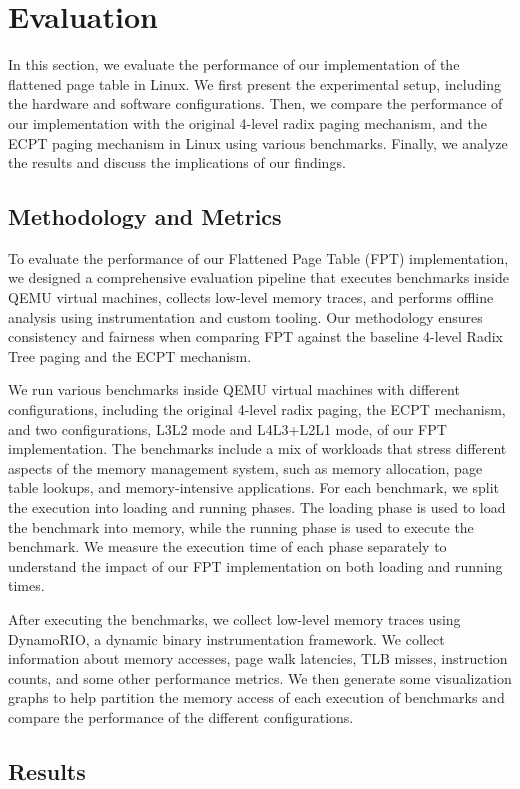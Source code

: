 \section{Evaluation}

In this section, we evaluate the performance of our implementation of the flattened page table in Linux. We first present the experimental setup, including the hardware and software configurations. Then, we compare the performance of our implementation with the original 4-level radix paging mechanism, and the ECPT paging mechanism in Linux using various benchmarks. Finally, we analyze the results and discuss the implications of our findings.


\subsection{Methodology and Metrics}

To evaluate the performance of our Flattened Page Table (FPT) implementation, we designed a comprehensive evaluation pipeline that executes benchmarks inside QEMU virtual machines, collects low-level memory traces, and performs offline analysis using instrumentation and custom tooling. Our methodology ensures consistency and fairness when comparing FPT against the baseline 4-level Radix Tree paging and the ECPT mechanism.

We run various benchmarks inside QEMU virtual machines with different configurations, including the original 4-level radix paging, the ECPT mechanism, and two configurations, L3L2 mode and L4L3+L2L1 mode, of our FPT implementation. The benchmarks include a mix of workloads that stress different aspects of the memory management system, such as memory allocation, page table lookups, and memory-intensive applications. For each benchmark, we split the execution into loading and running phases. The loading phase is used to load the benchmark into memory, while the running phase is used to execute the benchmark. We measure the execution time of each phase separately to understand the impact of our FPT implementation on both loading and running times.

After executing the benchmarks, we collect low-level memory traces using DynamoRIO, a dynamic binary instrumentation framework. We collect information about memory accesses, page walk latencies, TLB misses, instruction counts, and some other performance metrics. We then generate some visualization graphs to help partition the memory access of each execution of benchmarks and compare the performance of the different configurations.

\subsection{Results}


